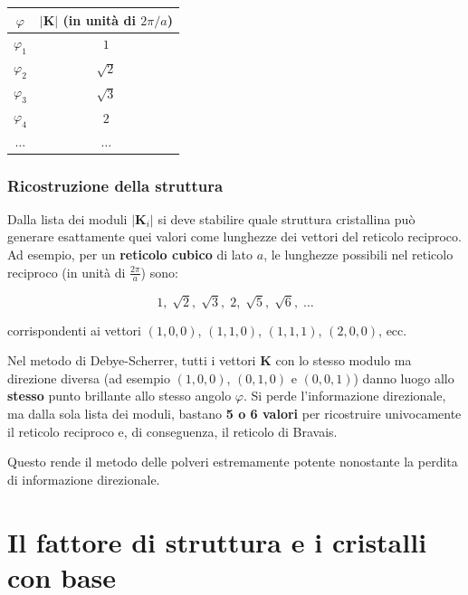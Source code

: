 \begin{table}[h!]
\centering
\renewcommand{\arraystretch}{1.3}
\begin{tabular}{|c|c|}
\hline
\textbf{$\varphi$} & \textbf{$|\mathbf{K}|$ (in unità di $2\pi/a$)} \\ \hline
$\varphi_1$ & $1$ \\ \hline
$\varphi_2$ & $\sqrt{2}$ \\ \hline
$\varphi_3$ & $\sqrt{3}$ \\ \hline
$\varphi_4$ & $2$ \\ \hline
$\ldots$ & $\ldots$ \\ \hline
\end{tabular}
\end{table}

\subsubsection*{Ricostruzione della struttura}

Dalla lista dei moduli $|\mathbf{K}_i|$ si deve stabilire quale struttura cristallina può generare esattamente quei valori come lunghezze dei vettori del reticolo reciproco. Ad esempio, per un \textbf{reticolo cubico} di lato $a$, le lunghezze possibili nel reticolo reciproco (in unità di $\frac{2\pi}{a}$) sono:

$$1,\; \sqrt{2},\; \sqrt{3},\; 2,\; \sqrt{5},\; \sqrt{6},\; \ldots$$

corrispondenti ai vettori $(1,0,0)$, $(1,1,0)$, $(1,1,1)$, $(2,0,0)$, ecc.

\begin{nota}
Nel metodo di Debye-Scherrer, tutti i vettori $\mathbf{K}$ con lo stesso modulo ma direzione diversa (ad esempio $(1,0,0)$, $(0,1,0)$ e $(0,0,1)$) danno luogo allo \textbf{stesso} punto brillante allo stesso angolo $\varphi$. Si perde l'informazione direzionale, ma dalla sola lista dei moduli, bastano \textbf{5 o 6 valori} per ricostruire univocamente il reticolo reciproco e, di conseguenza, il reticolo di Bravais.
\end{nota}

Questo rende il metodo delle polveri estremamente potente nonostante la perdita di informazione direzionale.

\section{Il fattore di struttura e i cristalli con base}



